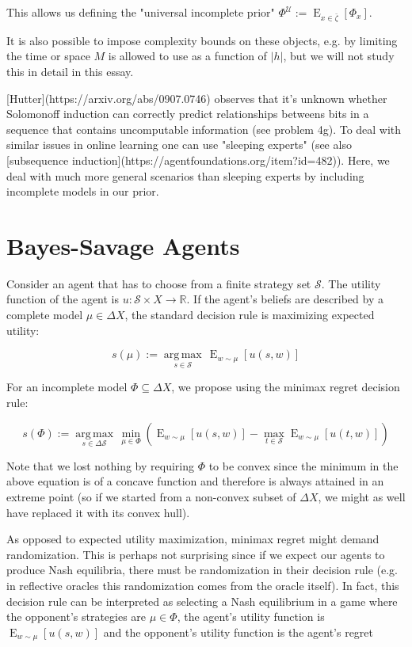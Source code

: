 \documentclass[a4paper]{article}
\DeclareMathOperator{\E}{E}
\newcommand{\Argmax}[1]{\underset{#1}{\operatorname{arg\,max}}\,}
\newcommand{\Reals}{\mathbb{R}}
\newcommand{\Abs}[1]{\lvert #1 \rvert}
\newcommand{\UTM}{\mathcal{U}}
\newcommand{\SP}[1]{\Delta #1}
\newcommand{\Strat}{\mathcal{S}}
\begin{document}
This allows us defining the "universal incomplete prior" ${\Phi^\UTM:=\E_{x \in \bar{\zeta}}[\Phi_x]}$.

It is also possible to impose complexity bounds on these objects, e.g. by limiting the time or space ${M}$ is allowed to use as a function of ${\Abs{h}}$, but we will not study this in detail in this essay.

[Hutter](https://arxiv.org/abs/0907.0746) observes that it's unknown whether Solomonoff induction can correctly predict relationships betweens bits in a sequence that contains uncomputable information (see problem 4g). To deal with similar issues in online learning one can use "sleeping experts" (see also [subsequence induction](https://agentfoundations.org/item?id=482)). Here, we deal with much more general scenarios than sleeping experts by including incomplete models in our prior.

\section{Bayes-Savage Agents}

Consider an agent that has to choose from a finite strategy set ${\Strat}$. The utility function of the agent is ${u: \Strat \times X \rightarrow \Reals}$. If the agent's beliefs are described by a complete model ${\mu \in \SP{X}}$, the standard decision rule is maximizing expected utility: 

$${s(\mu):=\Argmax{s \in \Strat} \E_{w \sim \mu}[u(s,w)]}$$

For an incomplete model ${\Phi \subseteq \SP{X}}$, we propose using the minimax regret decision rule:

$$s(\Phi):=\Argmax{s \in \SP{\Strat}} \min_{\mu \in \Phi}(\E_{w \sim \mu}[u(s,w)] - \max_{t \in \Strat} \E_{w \sim \mu}[u(t,w)])$$

Note that we lost nothing by requiring ${\Phi}$ to be convex since the minimum in the above equation is of a concave function and therefore is always attained in an extreme point (so if we started from a non-convex subset of ${\SP{X}}$, we might as well have replaced it with its convex hull).

As opposed to expected utility maximization, minimax regret might demand randomization. This is perhaps not surprising since if we expect our agents to produce Nash equilibria, there must be randomization in their decision rule (e.g. in reflective oracles this randomization comes from the oracle itself). In fact, this decision rule can be interpreted as selecting a Nash equilibrium in a game where the opponent's strategies are ${\mu \in \Phi}$, the agent's utility function is ${\E_{w \sim \mu}[u(s,w)]}$ and the opponent's utility function is the agent's regret 
\end{document}
